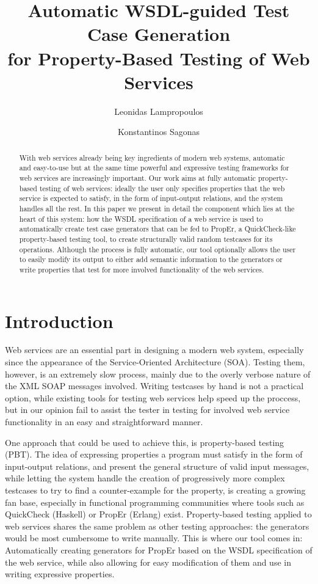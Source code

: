 \documentclass[submission,copyright,a4]{eptcs}
\title{Automatic WSDL-guided Test Case Generation\\
       for Property-Based Testing of Web Services}
\author{Leonidas Lampropoulos \and Konstantinos Sagonas}
\begin{document}
\maketitle

\begin{abstract}
With web services already being key ingredients of modern web systems,
automatic and easy-to-use but at the same time powerful and expressive
testing frameworks for web services are increasingly important. Our
work aims at fully automatic property-based testing of web services:
ideally the user only specifies properties that the web service is
expected to satisfy, in the form of input-output relations, and the
system handles all the rest. In this paper we present in detail the
component which lies at the heart of this system: how the WSDL
specification of a web service is used to automatically create test
case generators that can be fed to PropEr, a QuickCheck-like
property-based testing tool, to create structurally valid random
testcases for its operations. Although the process is fully automatic,
our tool optionally allows the user to easily modify its output to
either add semantic information to the generators or write properties
that test for more involved functionality of the web services.
\end{abstract}


\section{Introduction}



Web services are an essential part in designing a modern web system, 
especially since the appearance of the Service-Oriented Architecture (SOA).
Testing them, however, is an extremely slow process, mainly due to
the overly verbose nature of the XML SOAP messages involved. Writing 
testcases by hand is not a practical option, while existing tools for 
testing web services help speed up the proccess, but in our opinion fail 
to assist the tester in testing for involved web service functionality
in an easy and straightforward manner.


One approach that could be used to achieve this, is property-based testing (PBT).
The idea of expressing properties a program must satisfy in the form of 
input-output relations, and present the general structure of valid input 
messages, while letting the system handle the creation of progressively more 
complex testcases to try to find a counter-example for the property, is creating 
a growing fan base, especially in functional programming communities where 
tools such as QuickCheck (Haskell) or PropEr (Erlang) exist. Property-based 
testing applied to web services shares the same problem as other testing 
approaches: the generators would be most cumbersome to write manually. This is
where our tool comes in: Automatically creating generators for PropEr based on 
the WSDL specification of the web service, while also allowing for easy 
modification of them and use in writing expressive properties.
\end{document}
